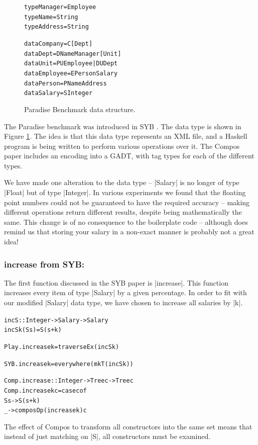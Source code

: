 \documentclass[preprint]{sigplanconf}
\newenvironment{code}{\begin{alltt}\small}{\end{alltt}}
\newcommand{\compare}[2]{\subsubsection*{\textsf{#1} from #2:}\vspace{-1ex}}
\begin{document}
\begin{figure}
\begin{code}
type Manager   = Employee
type Name      = String
type Address   = String

data Company   = C [Dept]
data Dept      = D Name Manager [Unit]
data Unit      = PU Employee | DU Dept
data Employee  = E Person Salary
data Person    = P Name Address
data Salary    = S Integer
\end{code}
\caption{Paradise Benchmark data structure.}
\label{fig:paradise}
\end{figure}

The Paradise benchmark was introduced in SYB \cite{lammel:syb}. The data type is shown in Figure \ref{fig:paradise}. The idea is that this data type represents an XML file, and a Haskell program is being written to perform various operations over it. The Compos paper includes an encoding into a GADT, with tag types for each of the different types.

We have made one alteration to the data type -- |Salary| is no longer of type |Float| but of type |Integer|. In various experiments we found that the floating point numbers could not be guaranteed to have the required accuracy -- making different operations return different results, despite being mathematically the same. This change is of no consequence to the boilerplate code -- although does remind us that storing your salary in a non-exact manner is probably not a great idea!

\compare{increase}{SYB}

The first function discussed in the SYB paper is |increase|. This function increases every item of type |Salary| by a given percentage. In order to fit with our modified |Salary| data type, we have chosen to increase all salaries by |k|.

\begin{code}
incS :: Integer -> Salary -> Salary
incS k (S s) = S (s + k)

Play.increase k = traverseEx (incS k)

SYB.increase k = everywhere (mkT (incS k))

Comp.increase :: Integer -> Tree c -> Tree c
Comp.increase k c = case c of
    S s -> S (s + k)
    _ -> composOp (increase k) c
\end{code}

The effect of Compos to transform all constructors into the same set means that instead of just matching on |S|, all constructors must be examined.
\end{document}
